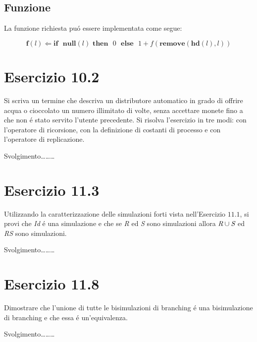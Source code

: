 		\subsection{Funzione}
		\qquad La funzione richiesta pu\'o essere implementata come segue:
		
		$$\textbf{f}(l) \Leftarrow \textbf{if}\text{ }\textbf{null}(l)\text{
		}\textbf{then}\text{ }0\text{ }\textbf{else}\text{ }1 +
		f(\textbf{remove}(\textbf{hd}(l),l))$$
		
		\newpage
		
	\section{Esercizio 10.2}
		\qquad Si scriva un termine che descriva un distributore automatico in grado
		di offrire acqua o cioccolato un numero illimitato di volte, senza accettare
		monete fino a che non \'e stato servito l'utente precedente. Si risolva
		l'esercizio in tre modi: con l'operatore di ricorsione, con la definizione di
		costanti di processo e con l'operatore di replicazione.
		
		\sectionline
		
		\qquad Svolgimento\ldots\ldots\ldots
		
		\newpage
		
	\section{Esercizio 11.3}
		\qquad Utilizzando la caratterizzazione delle simulazioni forti vista
		nell'Esercizio $11.1$, si provi che \emph{Id} \'e una simulazione e che se
		\emph{R} ed \emph{S} sono simulazioni allora $\emph{R} \cup \emph{S}$ ed
		\emph{RS} sono simulazioni.
		
		\sectionline
		
		\qquad Svolgimento\ldots\ldots\ldots
		
		\newpage
		
	\section{Esercizio 11.8}
		\qquad Dimostrare che l'unione di tutte le bisimulazioni di branching \'e una
		bisimulazione di branching e che essa \'e un'equivalenza.
		
		\sectionline
		
		\qquad Svolgimento\ldots\ldots\ldots
		
		\newpage
		
